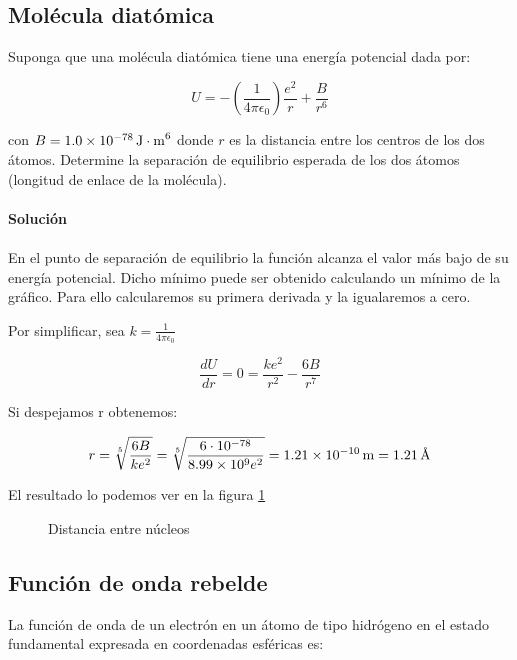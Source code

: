 \documentclass[12pt, a4paper]{article}
\begin{document}
    \subsection{Molécula diatómica}
    Suponga que una molécula diatómica tiene una energía potencial dada por:

    $$U=-\left(\frac{1}{4\pi\epsilon_0}\right)\frac{e^2}{r}+\frac{B}{r^6}$$

    con $B=\SI{1.0d-78}{\J\cdot\meter^6}$ donde $r$ es la distancia entre los centros de los dos átomos.
    Determine la separación de equilibrio esperada de los dos átomos (longitud de enlace de la molécula).

    \paragraph{\textbf{Solución}}
    \paragraph{} En el punto de separación de equilibrio la función alcanza el valor más bajo de su energía
    potencial. Dicho mínimo puede ser obtenido calculando un mínimo de la gráfico. Para ello
    calcularemos su primera derivada y la igualaremos a cero.

    Por simplificar, sea $k = \frac{1}{4\pi \epsilon_0}$

    $$\frac{dU}{dr} = 0 = \frac{k e^2}{r^2}-\frac{6 B}{r^7}$$

    Si despejamos r obtenemos:

    $$r = \sqrt[5]{\frac{6B}{k e^2}} = \sqrt[5]{\frac{6\cdot 10^{-78}}{\num{8.99d9} e^2}} = \SI{1.21d-10}{m} = \SI{1.21}{\angstrom}$$

    El resultado lo podemos ver en la figura \ref{gr:molecula_diatomica}

    \begin{figure}[ht]
      \centering
      \caption{Distancia entre núcleos} \label{gr:molecula_diatomica}
        \fontsize{8}{12}\selectfont
        \resizebox{1\textwidth}{!}{}
    \end{figure}
    \FloatBarrier   %

    \subsection{Función de onda rebelde}
    La función de onda de un electrón en un átomo de tipo hidrógeno en el estado fundamental
    expresada en coordenadas esféricas es:
\end{document}
